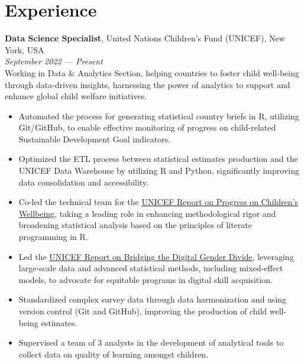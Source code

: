\documentclass[11pt,a4paper,sans]{moderncv}
\begin{document}
\section{Experience}
\noindent \textbf{Data Science Specialist}, United Nations Children's Fund (UNICEF), New York, USA \\
\textit{September 2022 — Present} \\
Working in Data \& Analytics Section, helping countries to foster child well-being through data-driven insights, harnessing the power of analytics to support and enhance global child welfare initiatives.
\begin{itemize}[noitemsep]
    \item Automated the process for generating statistical country briefs in R, utilizing Git/GitHub, to enable effective monitoring of progress on child-related Sustainable Development Goal indicators.
    \item Optimized the ETL process between statistical estimates production and the UNICEF Data Warehouse by utilizing R and Python, significantly improving data consolidation and accessibility.
    \item Co-led the technical team for the \href{https://data.unicef.org/resources/sdg-report-2023/}{\underline{UNICEF Report on Progress on Children's Wellbeing}}, taking a leading role in enhancing methodological rigor and broadening statistical analysis based on the principles of literate programming in R.
    \item Led the \href{https://data.unicef.org/resources/ictgenderdivide/}{\underline{UNICEF Report on Bridging the Digital Gender Divide}}, leveraging large-scale data and advanced statistical methods, including mixed-effect models, to advocate for equitable programs in digital skill acquisition.
    \item Standardized complex survey data through data harmonization and using version control (Git and GitHub), improving the production of child well-being estimates.
    \item Supervised a team of 3 analysts in the development of analytical tools to collect data on quality of learning amongst children.
\end{itemize}
\end{document}
